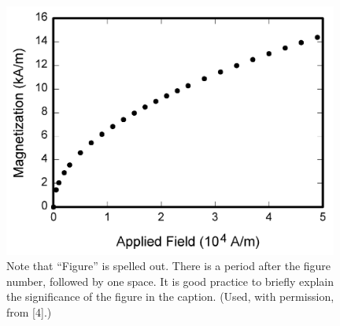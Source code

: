 \documentclass{IEEEcsmag}
\begin{document}
\begin{figure}
\centerline{\includegraphics[width=26pc]{figures/fig1.png}}
\caption{Note that ``Figure'' is spelled out. There is a period after the figure number, followed by one space. It is good practice to briefly explain the significance of the figure in the caption. (Used, with permission, from [4].)}
\end{figure}
\end{document}
